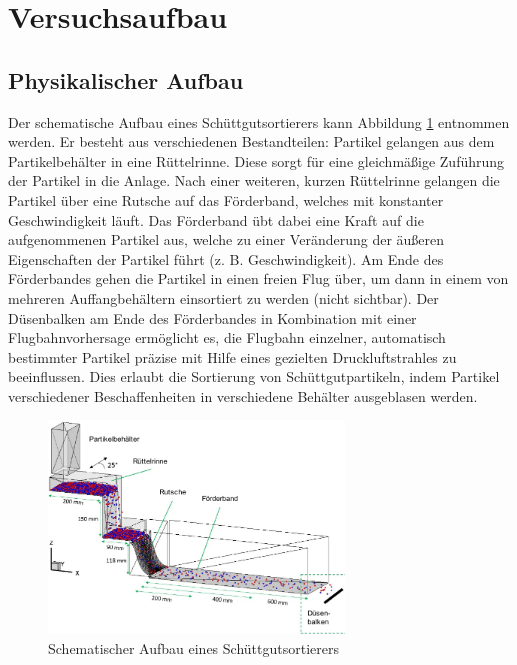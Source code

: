 \section{Versuchsaufbau}

\subsection{Physikalischer Aufbau}

Der schematische Aufbau eines Schüttgutsortierers kann Abbildung \ref{fig:SimAufbau} entnommen werden. Er besteht aus verschiedenen Bestandteilen: Partikel gelangen aus dem Partikelbehälter in eine Rüttelrinne. Diese sorgt für eine gleichmäßige Zuführung der Partikel in die Anlage. Nach einer weiteren, kurzen Rüttelrinne gelangen die Partikel über eine Rutsche auf das Förderband, welches mit konstanter Geschwindigkeit läuft. Das Förderband übt dabei eine Kraft auf die aufgenommenen Partikel aus, welche zu einer Veränderung der äußeren Eigenschaften der Partikel führt (z. B. Geschwindigkeit). Am Ende des Förderbandes gehen die Partikel in einen freien Flug über, um dann in einem von mehreren Auffangbehältern einsortiert zu werden (nicht sichtbar). Der Düsenbalken am Ende des Förderbandes in Kombination mit einer Flugbahnvorhersage ermöglicht es, die Flugbahn einzelner, automatisch bestimmter Partikel präzise mit Hilfe eines gezielten Druckluftstrahles zu beeinflussen. Dies erlaubt die Sortierung von Schüttgutpartikeln, indem Partikel verschiedener Beschaffenheiten in verschiedene Behälter ausgeblasen werden.

\begin{figure}[H]
    \centering
    \includegraphics[width=0.7\textwidth]{pics/SimulationsAufbau.pdf}
    \caption{Schematischer Aufbau eines Schüttgutsortierers \cite{ITM07_BrunnSawo}}
    \label{fig:SimAufbau}
\end{figure}

